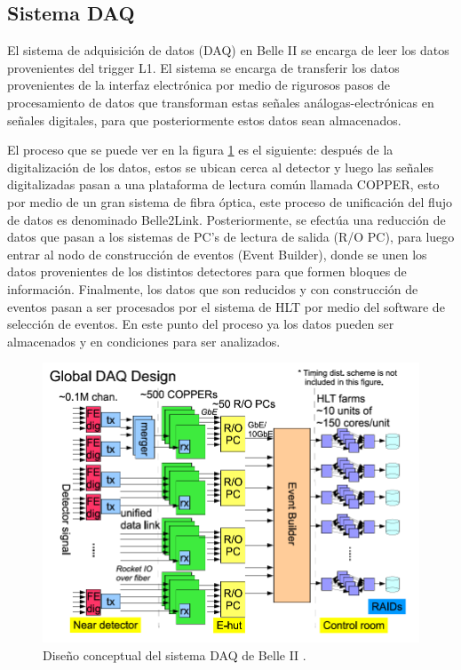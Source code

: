 \subsection{Sistema DAQ}

El sistema de adquisición de datos (DAQ) en Belle II se encarga de leer los datos provenientes del trigger L1. El sistema se encarga de transferir los datos provenientes de la interfaz electrónica por medio de rigurosos pasos de procesamiento de datos que transforman estas señales análogas-electrónicas en señales digitales, para que posteriormente estos datos sean almacenados.

El proceso que se puede ver en la figura \ref{fig:daq} es el siguiente: después de la digitalización de los datos, estos se ubican cerca al detector y luego las señales digitalizadas pasan a una plataforma de lectura común llamada COPPER, esto por medio de un gran sistema de fibra óptica, este proceso de unificación del flujo de datos es denominado Belle2Link. Posteriormente, se efectúa una reducción de datos que pasan a los sistemas de PC's de lectura de salida (R/O PC), para luego entrar al nodo de construcción de eventos (Event Builder), donde se unen los datos provenientes de los distintos detectores para que formen bloques de información. Finalmente, los datos que son reducidos y con construcción de eventos pasan a ser procesados por el sistema de HLT por medio del software de selección de eventos. En este punto del proceso ya los datos pueden ser almacenados y en condiciones para ser analizados.
\begin{figure}[h]
    \centering
    \includegraphics[scale=.5]{Images/DAQ.png}
    \caption{\small Diseño conceptual del sistema DAQ de Belle II \cite{abe2010belle}.}
    \label{fig:daq}
\end{figure} 
